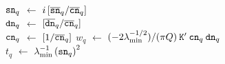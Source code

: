 \begin{algorithm2e}[t!]
{      ${\tt sn}_q$ $\gets$ $i \left[ \overline{\tt{sn}}_q / \overline{\tt{cn}}_q \right]$
      \\
      ${\tt dn}_q$ $\gets$ $\left[ \overline{\tt{dn}}_q / \overline{\tt{cn}}_q \right]$
      \\
      ${\tt cn}_q$ $\gets$ $\left[ 1 / \overline{\tt{cn}}_q \right]$
      \BlankLine
      $w_q$ $\gets$ $(-2 \lambda_\text{min}^{-1/2})/(\pi Q) \: {\tt K}' \: {\tt cn}_q \: {\tt dn}_q$
      \\
      $t_q$ $\gets$ $\lambda_\text{min}^{-1} \left( {\tt sn}_q \right)^2$
    }
\end{algorithm2e}
